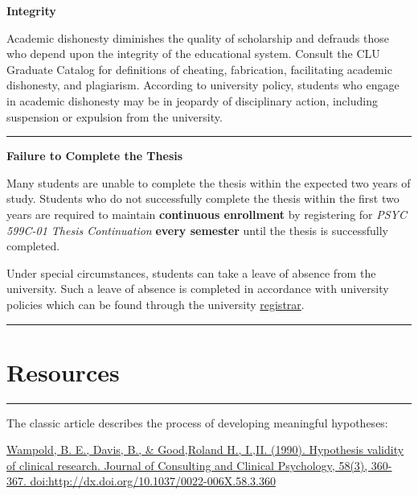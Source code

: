 \documentclass[openany]{book}
\begin{document}
\textbf{Integrity}

Academic dishonesty diminishes the quality of scholarship and defrauds those who depend upon the integrity of the educational system. Consult the CLU Graduate Catalog for definitions of cheating, fabrication, facilitating academic dishonesty, and plagiarism. According to university policy, students who engage in academic dishonesty may be in jeopardy of disciplinary action, including suspension or expulsion from the university.

\begin{center}\rule{0.5\linewidth}{0.5pt}\end{center}

\textbf{Failure to Complete the Thesis}

Many students are unable to complete the thesis within the expected two years of study. Students who do not successfully complete the thesis within the first two years are required to maintain \textbf{continuous enrollment} by registering for \emph{PSYC 599C-01 Thesis Continuation} \textbf{every semester} until the thesis is successfully completed.

Under special circumstances, students can take a leave of absence from the university. Such a leave of absence is completed in accordance with university policies which can be found through the university \href{https://www.callutheran.edu/students/registrar/}{registrar}.

\begin{center}\rule{0.5\linewidth}{0.5pt}\end{center}

\hypertarget{resources}{%
\chapter{Resources}\label{resources}}

\begin{center}\rule{0.5\linewidth}{0.5pt}\end{center}

The classic article describes the process of developing meaningful hypotheses:

\href{https://ezproxy.callutheran.edu/login?url=https://search-proquest-com.ezproxy.callutheran.edu/docview/210630433?accountid=9839}{Wampold, B. E., Davis, B., \& Good,Roland H., I.,II. (1990). Hypothesis validity of clinical research. Journal of Consulting and Clinical Psychology, 58(3), 360-367. doi:http://dx.doi.org/10.1037/0022-006X.58.3.360}
\end{document}

